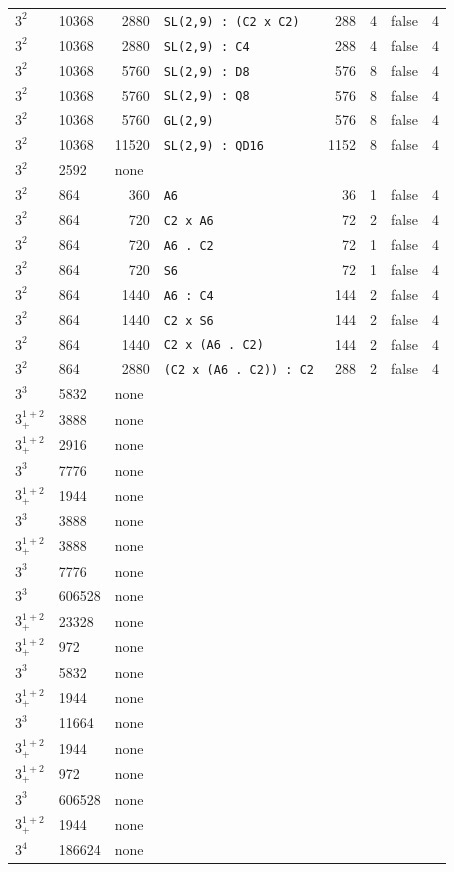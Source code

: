 \begin{longtable}{llrlrrll}
$3^2$ & 10368 & 2880 & \texttt{SL(2,9) : (C2 x C2)} & 288 & 4 & false & 4\\
$3^2$ & 10368 & 2880 & \texttt{SL(2,9) : C4} & 288 & 4 & false & 4\\
$3^2$ & 10368 & 5760 & \texttt{SL(2,9) : D8} & 576 & 8 & false & 4\\
$3^2$ & 10368 & 5760 & \texttt{SL(2,9) : Q8} & 576 & 8 & false & 4\\
$3^2$ & 10368 & 5760 & \texttt{GL(2,9)} & 576 & 8 & false & 4\\
$3^2$ & 10368 & 11520 & \texttt{SL(2,9) : QD16} & 1152 & 8 & false & 4\\
$3^2$ & 2592 & \multicolumn{6}{l}{none}\\
$3^2$ & 864 & 360 & \texttt{A6} & 36 & 1 & false & 4\\
$3^2$ & 864 & 720 & \texttt{C2 x A6} & 72 & 2 & false & 4\\
$3^2$ & 864 & 720 & \texttt{A6 . C2} & 72 & 1 & false & 4\\
$3^2$ & 864 & 720 & \texttt{S6} & 72 & 1 & false & 4\\
$3^2$ & 864 & 1440 & \texttt{A6 : C4} & 144 & 2 & false & 4\\
$3^2$ & 864 & 1440 & \texttt{C2 x S6} & 144 & 2 & false & 4\\
$3^2$ & 864 & 1440 & \texttt{C2 x (A6 . C2)} & 144 & 2 & false & 4\\
$3^2$ & 864 & 2880 & \texttt{(C2 x (A6 . C2)) : C2} & 288 & 2 & false & 4\\
$3^3$ & 5832 & \multicolumn{6}{l}{none}\\
$3^{1+2}_+$ & 3888 & \multicolumn{6}{l}{none}\\
$3^{1+2}_+$ & 2916 & \multicolumn{6}{l}{none}\\
$3^3$ & 7776 & \multicolumn{6}{l}{none}\\
$3^{1+2}_+$ & 1944 & \multicolumn{6}{l}{none}\\
$3^3$ & 3888 & \multicolumn{6}{l}{none}\\
$3^{1+2}_+$ & 3888 & \multicolumn{6}{l}{none}\\
$3^3$ & 7776 & \multicolumn{6}{l}{none}\\
$3^3$ & 606528 & \multicolumn{6}{l}{none}\\
$3^{1+2}_+$ & 23328 & \multicolumn{6}{l}{none}\\
$3^{1+2}_+$ & 972 & \multicolumn{6}{l}{none}\\
$3^3$ & 5832 & \multicolumn{6}{l}{none}\\
$3^{1+2}_+$ & 1944 & \multicolumn{6}{l}{none}\\
$3^3$ & 11664 & \multicolumn{6}{l}{none}\\
$3^{1+2}_+$ & 1944 & \multicolumn{6}{l}{none}\\
$3^{1+2}_+$ & 972 & \multicolumn{6}{l}{none}\\
$3^3$ & 606528 & \multicolumn{6}{l}{none}\\
$3^{1+2}_+$ & 1944 & \multicolumn{6}{l}{none}\\
$3^4$ & 186624 & \multicolumn{6}{l}{none}\\
\end{longtable}
